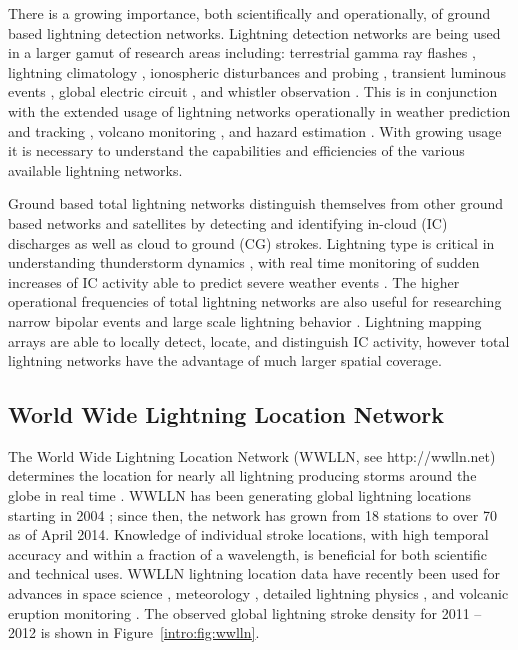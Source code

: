 There is a growing importance, both scientifically and operationally, of ground based lightning detection networks.
Lightning detection networks are being used in a larger gamut of research areas including: terrestrial gamma ray flashes \citep{Dwyer2012, Gjesteland2011, Connaughton2010}, lightning climatology \citep{Virts2013, Virts2011a, Burgesser2012}, ionospheric disturbances and probing \citep{Jacobson2010, Singh2011}, transient luminous events \citep{Soula2011}, global electric circuit  \citep{Holzworth2005}, and whistler observation \citep{Collier2010, Collier2011a, Burkholder2013}.
This is in conjunction with the extended usage of lightning networks operationally in weather prediction and tracking \citep{Fierro2012, Pan2010, Thomas2010d}, volcano monitoring \citep{Doughton2010}, and hazard estimation \citep{Altaratz2010}.
With growing usage it is necessary to understand the capabilities and efficiencies of the various available lightning networks.

Ground based total lightning networks distinguish themselves from other ground based networks and satellites by detecting and identifying in-cloud (IC) discharges as well as cloud to ground (CG) strokes.
Lightning type is critical in understanding thunderstorm dynamics \citep{Williams1989}, with real time monitoring of sudden increases of IC activity able to predict severe weather events \citep{Rudlosky2013, Darden2010, Metzger2013, Schultz2009, Schultz2011}.
The higher operational frequencies of total lightning networks are also useful for researching narrow bipolar events \citep{Suszcynsky2003} and large scale lightning behavior \citep{Hutchins2013}.
Lightning mapping arrays are able to locally detect, locate, and distinguish IC activity, however total lightning networks have the advantage of much larger spatial coverage.

\subsection{World Wide Lightning Location Network}

The World Wide Lightning Location Network (WWLLN, see http://wwlln.net) determines the location for nearly all lightning producing storms around the globe in real time \citep{Jacobson2006c}.
WWLLN has been generating global lightning locations starting in 2004 \citep{Rodger2006, Rodger2009}; since then, the network has grown from 18 stations to over 70 as of April 2014.
Knowledge of individual stroke locations, with high temporal accuracy and within a fraction of a wavelength, is beneficial for both scientific and technical uses.
WWLLN lightning location data have recently been used for advances in space science \citep{Lay2007, Kumar2009, Collier2009, Holzworth2011, Jacobson2011}, meteorology \citep{Price2009,Thomas2010d}, detailed lightning physics \citep{Connaughton2010}, and volcanic eruption monitoring \citep{Doughton2010}.
The observed global lightning stroke density for 2011 -- 2012 is shown in Figure~\ref{intro:fig:wwlln}.


